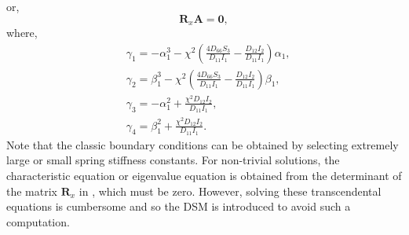 \documentclass[preprint,12pt,number]{elsarticle}
\begin{document}
%
or,
%
\begin{equation}\label{eq:ABx1}
\mathbf{R}_x \mathbf{A} = \mathbf{0},
\end{equation}
%
where,
%
\begin{equation}\label{eq:gamma}
\begin{split}
	&\gamma_1 = -\alpha_1^3 - \chi^2 \left( \frac{4D_{66}S_3}{D_{11}I_1} - \frac{D_{12}I_2}{D_{11}I_1} \right) \alpha_1, \\
	&\gamma_2 = \beta_1^3 - \chi^2 \left( \frac{4D_{66}S_3}{D_{11}I_1} - \frac{D_{12}I_2}{D_{11}I_1} \right) \beta_1, \\
	&\gamma_3 = -\alpha_1^2 + \frac{\chi^2 D_{12} I_2}{D_{11} I_1}, \\
	&\gamma_4 = \beta_1^2 + \frac{\chi^2 D_{12} I_2}{D_{11} I_1}.
\end{split}
\end{equation}
%
Note that the classic boundary conditions can be obtained by selecting extremely large or small spring stiffness constants.
For non-trivial solutions, the characteristic equation or eigenvalue equation is obtained from the determinant of the matrix $\mathbf{R}_x$ in , which must be zero.
However, solving these transcendental equations is cumbersome and so the DSM is introduced to avoid such a computation.
\end{document}
